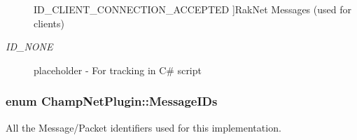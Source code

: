 \begin{Desc}
\begin{description}
{\hypertarget{namespace_champ_net_plugin_a2ade5cfa7cf6c25ab7236c6b54a57821a0295101371b4a70a1c007a4f6e206e1d}{I\-D\-\_\-\-C\-L\-I\-E\-N\-T\-\_\-\-C\-O\-N\-N\-E\-C\-T\-I\-O\-N\-\_\-\-A\-C\-C\-E\-P\-T\-E\-D}\label{namespace_champ_net_plugin_a2ade5cfa7cf6c25ab7236c6b54a57821a0295101371b4a70a1c007a4f6e206e1d}
}]Rak\-Net Messages (used for clients) \item[{\em 
\hypertarget{namespace_champ_net_plugin_a2ade5cfa7cf6c25ab7236c6b54a57821aad940f5ef8633f353088061ccf06623d}{I\-D\-\_\-\-N\-O\-N\-E}\label{namespace_champ_net_plugin_a2ade5cfa7cf6c25ab7236c6b54a57821aad940f5ef8633f353088061ccf06623d}
}]placeholder -\/ For tracking in C\# script \end{description}
\end{Desc}
\hypertarget{namespace_champ_net_plugin_a2ade5cfa7cf6c25ab7236c6b54a57821}{
\subsubsection[{Message\-I\-Ds}]{\setlength{\rightskip}{0pt plus 5cm}enum {\bf Champ\-Net\-Plugin\-::\-Message\-I\-Ds}}}\label{namespace_champ_net_plugin_a2ade5cfa7cf6c25ab7236c6b54a57821}


All the Message/\-Packet identifiers used for this implementation. 

